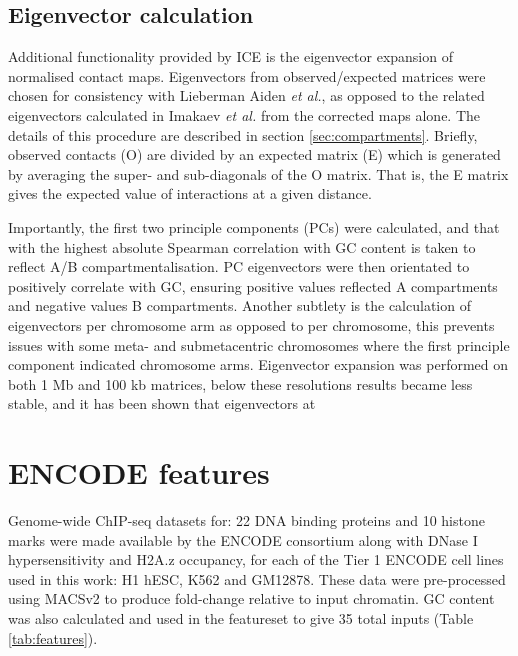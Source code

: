 \documentclass[a4paper,10pt,oneside]{book}
\begin{document}
\subsection{Eigenvector calculation}\label{sec:eigs}
Additional functionality provided by ICE is the eigenvector expansion of normalised contact maps. Eigenvectors from observed/expected matrices were chosen for consistency with Lieberman Aiden \emph{et al.},\cite{Lieberman2009} as opposed to the related eigenvectors calculated in Imakaev \emph{et al.}\cite{Imakaev2012} from the corrected maps alone. The details of this procedure are described in section \ref{sec:compartments}. Briefly, observed contacts (O) are divided by an expected matrix (E) which is generated by averaging the super- and sub-diagonals of the O matrix. That is, the E matrix gives the expected value of interactions at a given distance.

Importantly, the first two principle components (PCs) were calculated, and that with the highest absolute Spearman correlation with GC content is taken to reflect A/B compartmentalisation. PC eigenvectors were then orientated to positively correlate with GC, ensuring positive values reflected A compartments and negative values B compartments. Another subtlety is the calculation of eigenvectors per chromosome arm as opposed to per chromosome, this prevents issues with some meta- and submetacentric chromosomes where the first principle component indicated chromosome arms.\cite{Lieberman2009, Imakaev2012} Eigenvector expansion was performed on both 1 Mb and 100 kb matrices, below these resolutions results became less stable, and it has been shown that eigenvectors at

\section{ENCODE features}\label{methods:encode}

Genome-wide ChIP-seq datasets for: 22 DNA binding proteins and 10
histone marks were made available by the ENCODE
consortium\citep{Dunham2012, Boyle2014} along with DNase I
hypersensitivity and H2A.z occupancy, for each of the Tier 1 ENCODE cell
lines used in this work: H1 hESC, K562 and GM12878. These data were
pre-processed using MACSv2\citep{Zhang2008} to produce fold-change
relative to input chromatin. GC content was also calculated and used in
the featureset to give 35 total inputs (Table \ref{tab:features}).
\end{document}
